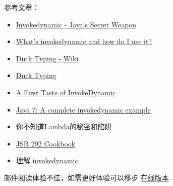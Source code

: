 \documentclass[12pt]{article}
\begin{document}
参考文章：

\begin{itemize}
\tightlist
\item
  \href{https://www.infoq.com/articles/Invokedynamic-Javas-secret-weapon/}{Invokedynamic - Java's Secret Weapon}
\item
  \href{https://stackoverflow.com/questions/6638735/whats-invokedynamic-and-how-do-i-use-it}{What's invokedynamic and how do I use it?}
\item
  \href{https://zh.wikipedia.org/wiki/\%E9\%B8\%AD\%E5\%AD\%90\%E7\%B1\%BB\%E5\%9E\%8B}{Duck Typing - Wiki}
\item
  \href{https://devopedia.org/duck-typing}{Duck Typing}
\item
  \href{http://blog.headius.com/2008/09/first-taste-of-invokedynamic.html}{A First Taste of InvokeDynamic}
\item
  \href{https://www.javacodegeeks.com/2012/02/java-7-complete-invokedynamic-example.html}{Java 7: A complete invokedynamic example}
\item
  \href{https://my.oschina.net/lt0314/blog/3146028}{你不知道Lambda的秘密和陷阱}
\item
  \href{http://wiki.jvmlangsummit.com/images/9/93/2011_Forax.pdf}{JSR 292 Cookbook}
\item
  \href{https://www.jianshu.com/p/d74e92f93752}{理解 invokedynamic}
\end{itemize}

邮件阅读体验不佳，如需更好体验可以移步 \href{https://riguz.com/it/java/java_invokedynamic/}{在线版本}
\end{document}
